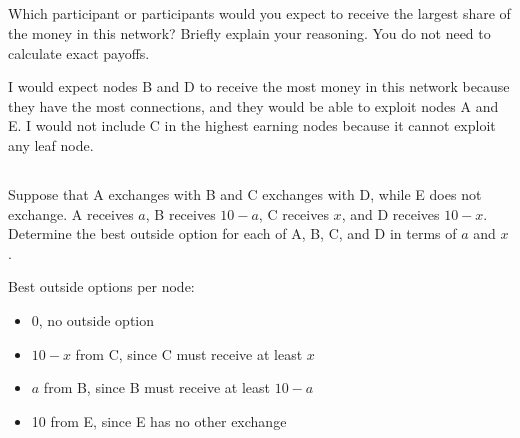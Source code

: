 \documentclass[newpages]{assignment}
\begin{document}
\subsection{}
\begin{problem}
    Which participant or participants would you expect to receive the largest share of the money in this network? Briefly explain your reasoning. You do not need to calculate exact payoffs.
\end{problem}

\begin{solution}
    I would expect nodes B and D to receive the most money in this network because they have the most connections, and they would be able to exploit nodes A and E. I would not include C in the highest earning nodes because it cannot exploit any leaf node.
\end{solution}

\subsection{}
\begin{problem}
    Suppose that A exchanges with B and C exchanges with D, while E does not exchange. A receives \(a\), B receives \(10-a\), C receives \(x\), and D receives \(10-x\). Determine the best outside option for each of A, B, C, and D in terms of \(a\) and \(x\).
\end{problem}

\begin{solution}
    \begin{figure}[H]
        \centering
    \end{figure}

    Best outside options per node:
    \begin{itemize}
        \item[A:] 0, no outside option
        \item[B:] $10-x$ from C, since C must receive at least $x$
        \item[C:] $a$ from B, since B must receive at least $10-a$
        \item[D:] 10 from E, since E has no other exchange
    \end{itemize}
\end{solution}
\end{document}
